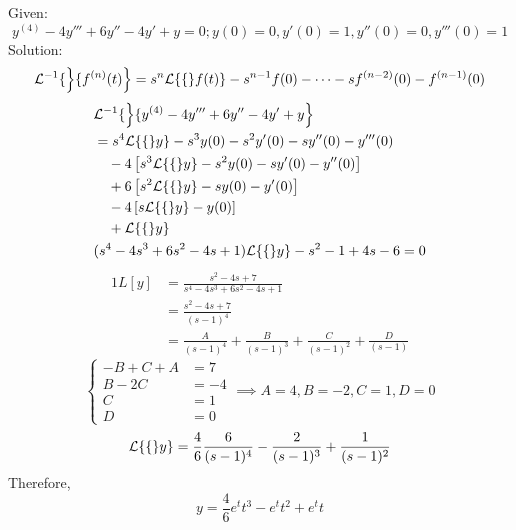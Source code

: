 \documentclass[diffeq.tex]{subfiles}
\begin{document}
\begin{homework*}[255.13]
    Given:
    \begin{equation}
        y^{(4)} - 4y''' + 6y'' - 4y' + y = 0; y(0) = 0, y'(0) = 1, y''(0) = 0, y'''(0) = 1
    \end{equation}
    Solution:
    \begin{equation}
        \mathcal{L}^{-1}\{\left\}\{f^{(n)}(t)\right\} = s^{n}\mathcal{L}\{\{\}f(t)\} - s^{n-1}f(0) - \dots - sf^{(n - 2)}(0)-f^{(n-1)}(0)
    \end{equation}
    \begin{alignat}{1}
        &\mathcal{L}^{-1}\{\left\}\{y^{(4)} - 4y''' + 6y'' - 4y' + y\right\}\\
        &= s^{4}\mathcal{L}\{\{\}y\} - s^{3}y(0) - s^{2}y'(0) - sy''(0) - y'''(0)\nonumber\\
        &\quad -4\left[s^{3}\mathcal{L}\{\{\}y\} - s^{2}y(0) - sy'(0) -y''(0)\right]\nonumber\\
        &\quad +6\left[s^{2}\mathcal{L}\{\{\}y\} - sy(0) - y'(0)\right]\nonumber\\
        &\quad -4\left[s\mathcal{L}\{\{\}y\}-y(0)\right]\nonumber\\
        &\quad + \mathcal{L}\{\{\}y\}\\
        &(s^{4}-4s^{3}+6s^{2}-4s+1)\mathcal{L}\{\{\}y\} - s^{2} - 1 + 4s - 6 = 0
    \end{alignat}
    \begin{alignat}{1}
        L[y] &= \frac{s^{2} - 4s + 7}{s^{4} - 4s^{3}+ 6s^{2} - 4s + 1}\\
        &= \frac{s^{2} - 4s + 7}{(s - 1)^{4}}\\
        &= \frac{A}{(s-1)^{4}} + \frac{B}{(s-1)^{3}} + \frac{C}{(s-1)^{2}} + \frac{D}{(s-1)}
    \end{alignat}
    \begin{equation}
        \begin{cases}
            -B + C + A &= 7\\
            B - 2C &= -4\\
            C &= 1\\
            D &= 0
        \end{cases}
        \implies A = 4, B = -2, C = 1, D = 0
    \end{equation}
    \begin{equation}
        \mathcal{L}\{\{\}y\} = \frac{4}{6}\frac{6}{(s - 1)^{4}}-\frac{2}{(s-1)^{3}}+\frac{1}{(s-1)^{2}}
    \end{equation}
    Therefore,
    \begin{equation}
        y = \frac{4}{6}e^{t}t^{3} - e^{t}t^{2} + e^{t}t
    \end{equation}
\end{homework*}
\end{document}
